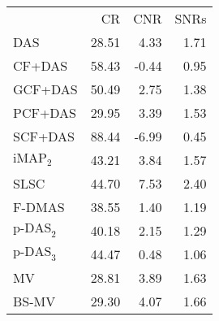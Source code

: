 \begin{tabular}{lrrr}
 & CR & CNR & SNRs \\
DAS & 28.51 & 4.33 & 1.71 \\
CF+DAS & 58.43 & -0.44 & 0.95 \\
GCF+DAS & 50.49 & 2.75 & 1.38 \\
PCF+DAS & 29.95 & 3.39 & 1.53 \\
SCF+DAS & 88.44 & -6.99 & 0.45 \\
$\text{iMAP}_2$ & 43.21 & 3.84 & 1.57 \\
SLSC & 44.70 & 7.53 & 2.40 \\
F-DMAS & 38.55 & 1.40 & 1.19 \\
$\text{p-DAS}_2$ & 40.18 & 2.15 & 1.29 \\
$\text{p-DAS}_3$ & 44.47 & 0.48 & 1.06 \\
MV & 28.81 & 3.89 & 1.63 \\
BS-MV & 29.30 & 4.07 & 1.66 \\
\end{tabular}
